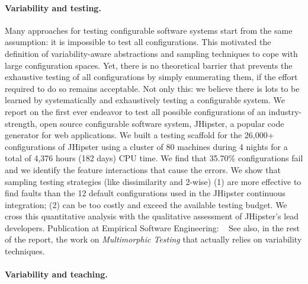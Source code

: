 \paragraph{Variability and testing.}
Many approaches for testing configurable software systems start from the same assumption: it is impossible to test all configurations. This motivated the definition of variability-aware abstractions and sampling techniques to cope with large configuration spaces. Yet, there is no theoretical barrier that prevents the exhaustive testing of all configurations by simply enumerating them, if the effort required to do so remains acceptable. Not only this: we believe there is lots to be learned by systematically and exhaustively testing a configurable system. We report on the first ever endeavor to test all possible configurations of an industry-strength, open source configurable software system, JHipster, a popular code generator for web applications. We built a testing scaffold for the 26,000+ configurations of JHipster using a cluster of 80 machines during 4 nights for a total of 4,376 hours (182 days) CPU time. We find that 35.70\% configurations fail and we identify the feature interactions that cause the errors. We show that sampling testing strategies (like dissimilarity and 2-wise) (1) are more effective to find faults than the 12 default configurations used in the JHipster continuous integration; (2) can be too costly and exceed the available testing budget. We cross this quantitative analysis with the qualitative assessment of JHipster's lead developers.
Publication at Empirical Software Engineering: ~\cite{halin:hal-01829928}
See also, in the rest of the report, the work on \emph{Multimorphic Testing} that actually relies on variability techniques. 


\paragraph{Variability and teaching.}

